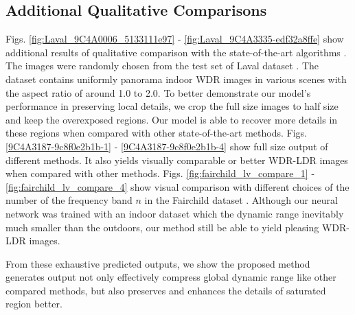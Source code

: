 \documentclass[journal]{IEEEtran}
\begin{document}
\subsection{Additional Qualitative Comparisons}
Figs. \ref{fig:Laval_9C4A0006_5133111e97} - \ref{fig:Laval_9C4A3335-edf32a8ffe} show additional results of qualitative comparison with the state-of-the-art algorithms \cite{mantiuk2008display, paris2015local, ferradans2011analysis, mai2011optimizing, gu2013local, photomatrix}. The images were randomly chosen from the test set of Laval dataset \cite{gardner2017learning}.  The dataset contains uniformly panorama indoor WDR images in various scenes with the aspect ratio of around 1.0 to 2.0.  To better demonstrate our model's performance in preserving local details, we crop the full size images to half size and keep the overexposed regions. Our model is able to recover more details in these regions when compared with other state-of-the-art methods.  Figs. \ref{9C4A3187-9c8f0e2b1b-1} - \ref{9C4A3187-9c8f0e2b1b-4} show full size output of different methods.  It also yields visually comparable or better WDR-LDR images when compared with other methods.  Figs. \ref{fig:fairchild_lv_compare_1} - \ref{fig:fairchild_lv_compare_4} show visual comparison with different choices of the number of the frequency band $n$ in the Fairchild dataset \cite{fairchild2007hdr}.  Although our neural network was trained with an indoor dataset which the dynamic range inevitably much smaller than the outdoors, our method still be able to yield pleasing WDR-LDR images.

From these exhaustive predicted outputs, we show the proposed method generates output not only effectively compress global dynamic range like other compared methods, but also preserves and enhances the details of saturated region better.

\end{document}
